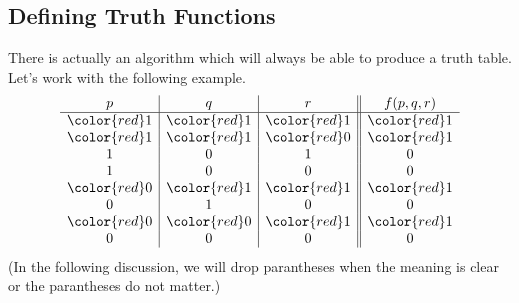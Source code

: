 \subsection{Defining Truth Functions}
There is actually an algorithm which will always be able to produce a truth table. Let's work with the following example.
\[\begin{array}{c|c|c||c}
	p & q & r & f(p,q,r) \\
	\hline
	\color{red}1 & \color{red}1 & \color{red}1 & \color{red}1 \\
	\color{red}1 & \color{red}1 & \color{red}0 & \color{red}1 \\
	1 & 0 & 1 & 0 \\
	1 & 0 & 0 & 0 \\
	\color{red}0 & \color{red}1 & \color{red}1 & \color{red}1 \\
	0 & 1 & 0 & 0 \\
	\color{red}0 & \color{red}0 & \color{red}1 & \color{red}1 \\
	0 & 0 & 0 & 0
\end{array}\]
(In the following discussion, we will drop parantheses when the meaning is clear or the parantheses do not matter.)

